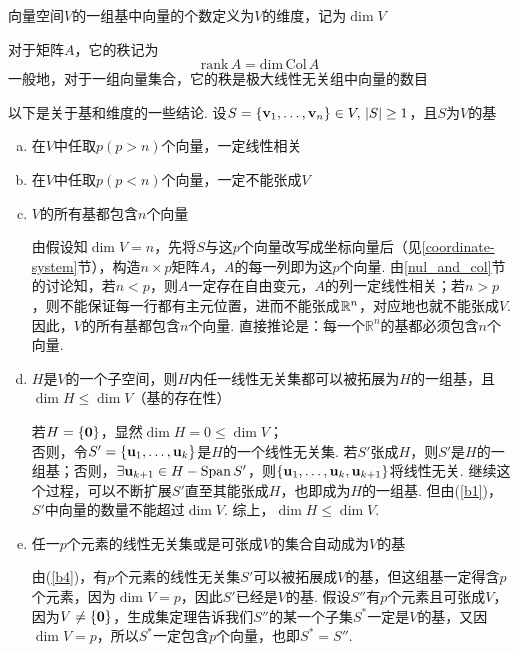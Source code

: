 \begin{definition}[维度]
向量空间$V$的一组基中向量的个数定义为$V$的维度，记为$\dim V$
\end{definition}
\begin{definition}[秩]
对于矩阵$A$，它的秩记为
\[\mathrm{rank}\,A=\mathrm{dim}\,\mathrm{Col}\,A\]
一般地，对于一组向量集合，它的秩是极大线性无关组中向量的数目
\end{definition}
\begin{theorem}以下是关于基和维度的一些结论. 设$S=\{\mathbf{v}_1,\dots,\mathbf{v}_n\}\in V,\,|S|\geq 1$，且$S$为$V$的基
\label{basis_theo}
\begin{enumerate}[(a)]
	\itemsep -1pt
	\item \label{b1}在$V$中任取$p(p>n)$个向量，一定线性相关 %
	\item 在$V$中任取$p(p<n)$个向量，一定不能张成$V$%
	\item $V$的所有基都包含$n$个向量
	\begin{analysis}
	由假设知$\dim V=n$，先将$S$与这$p$个向量改写成坐标向量后（见\ref{coordinate-system}节），构造$n\times p$矩阵$A$，$A$的每一列即为这$p$个向量. 由\ref{nul_and_col}节的讨论知，若$n<p$，则$A$一定存在自由变元，$A$的列一定线性相关；若$n>p$，则不能保证每一行都有主元位置，进而不能张成$\mathbb{R}^n$，对应地也就不能张成$V$. 因此，$V$的所有基都包含$n$个向量.
	直接推论是：每一个$\mathbb{R}^n$的基都必须包含$n$个向量.
	\end{analysis}
	\item \label{b4}$H$是$V$的一个子空间，则$H$内任一线性无关集都可以被拓展为$H$的一组基，且$\dim H\leq\dim V$（基的存在性）
	\begin{analysis}
	若$H=\{\mathbf{0}\}$，显然$\dim H=0\leq\dim V$；\\
	否则，令$S'=\{\mathbf{u}_1,\dots,\mathbf{u}_k\}$是$H$的一个线性无关集. 若$S'$张成$H$，则$S'$是$H$的一组基；否则，$\exists\mathbf{u}_{k+1}\in H-\mathrm{Span}\, S'$，则$\{\mathbf{u}_1,\dots,\mathbf{u}_k,\mathbf{u}_{k+1}\}$将线性无关. 继续这个过程，可以不断扩展$S'$直至其能张成$H$，也即成为$H$的一组基. 但由(\ref{b1})，$S'$中向量的数量不能超过$\dim V$. 综上，$\dim H\leq\dim V$.
	\end{analysis}
	\item \label{b5}任一$p$个元素的线性无关集或是可张成$V$的集合自动成为$V$的基
	\begin{analysis}
	由(\ref{b4})，有$p$个元素的线性无关集$S'$可以被拓展成$V$的基，但这组基一定得含$p$个元素，因为$\dim V=p$，因此$S'$已经是$V$的基. 假设$S''$有$p$个元素且可张成$V$，因为$V\ne\{\mathbf{0}\}$，生成集定理告诉我们$S''$的某一个子集$S^*$一定是$V$的基，又因$\dim V=p$，所以$S^*$一定包含$p$个向量，也即$S^*=S''$.

\end{analysis}
\end{enumerate}
\end{theorem}
